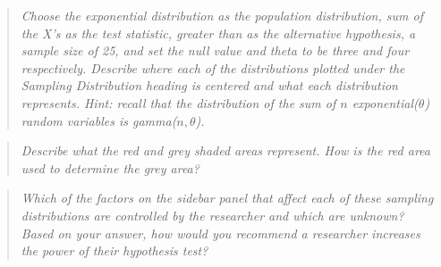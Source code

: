 \documentclass{TISE}
\begin{document}
\begin{quote}
	\textit{Choose the exponential distribution as the population distribution, sum of the X's as the test statistic, greater than as the alternative hypothesis, a sample size of 25, and set the null value and theta to be three and four respectively. Describe where each of the distributions plotted under the Sampling Distribution heading is centered and what each distribution represents. Hint: recall that the distribution of the sum of $n$ exponential($\theta$) random variables is gamma($n, \theta$).}
\end{quote}

\begin{quote}
	\textit{Describe what the red and grey shaded areas represent. How is the red area used to determine the grey area?}
\end{quote}

\begin{quote}
	\textit{Which of the factors on the sidebar panel that affect each of these sampling distributions are controlled by the researcher and which are unknown? Based on your answer, how would you recommend a researcher increases the power of their hypothesis test?}
\end{quote}
\end{document}
